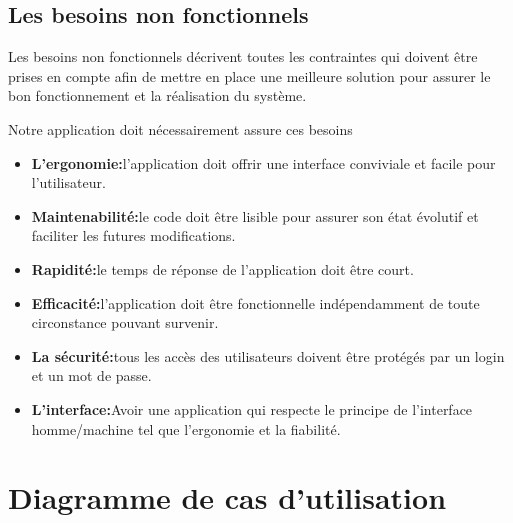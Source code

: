 \documentclass[edit,12pt,a4paper,ChapStyle,oneside,doubleinterligne]{report}
\begin{document}
\subsection{Les besoins non fonctionnels}
Les besoins non fonctionnels décrivent toutes les contraintes qui doivent être prises en compte afin de mettre en place une meilleure solution pour assurer le bon fonctionnement et la réalisation du système.

Notre application doit nécessairement assure ces besoins
\begin{itemize}
    \item \textbf{L’ergonomie:}l’application doit offrir une interface conviviale et facile pour l’utilisateur.
    \item \textbf{Maintenabilité:}le code doit être lisible pour assurer son état évolutif et faciliter les futures modifications.
    \item \textbf{Rapidité:}le temps de réponse de l’application doit être court.
    \item \textbf{Efficacité:}l’application doit être fonctionnelle indépendamment de toute circonstance pouvant survenir.
    \item \textbf{La sécurité:}tous les accès des utilisateurs doivent être protégés par un login et un mot de passe.
    \item \textbf{L’interface:}Avoir une application qui respecte le principe de \newline l'interface homme/machine tel que l'ergonomie et la fiabilité.
\end{itemize}
\section{ Diagramme de cas d'utilisation }
\end{document}
